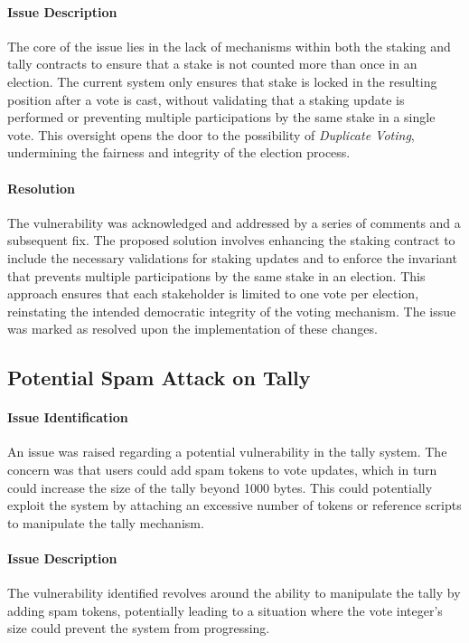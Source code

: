 \documentclass[11pt]{article}
\begin{document}
\paragraph{Issue Description}
The core of the issue lies in the lack of mechanisms within both the staking and tally contracts to ensure that a stake is not counted more than once in an election.
The current system only ensures that stake is locked in the resulting position after a vote is cast, without validating that a staking update is performed or preventing multiple participations by the same stake in a single vote.
This oversight opens the door to the possibility of \textit{Duplicate Voting}, undermining the fairness and integrity of the election process.

\paragraph{Resolution}
The vulnerability was acknowledged and addressed by a series of comments and a subsequent fix.
The proposed solution involves enhancing the staking contract to include the necessary validations for staking updates and to enforce the invariant that prevents multiple participations by the same stake in an election.
This approach ensures that each stakeholder is limited to one vote per election, reinstating the intended democratic integrity of the voting mechanism.
The issue was marked as resolved upon the implementation of these changes.

\subsection{Potential Spam Attack on Tally}

\paragraph{Issue Identification}
An issue was raised regarding a potential vulnerability in the tally system.
The concern was that users could add spam tokens to vote updates, which in turn could increase the size of the tally beyond 1000 bytes.
This could potentially exploit the system by attaching an excessive number of tokens or reference scripts to manipulate the tally mechanism.

\paragraph{Issue Description}
The vulnerability identified revolves around the ability to manipulate the tally by adding spam tokens, potentially leading to a situation where the vote integer's size could prevent the system from progressing.
\end{document}

